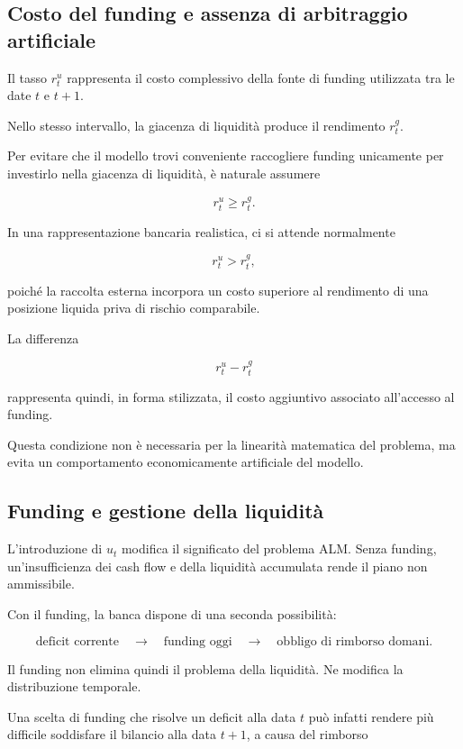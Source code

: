 \subsection{Costo del funding e assenza di arbitraggio artificiale}

Il tasso $r^u_t$ rappresenta il costo complessivo della fonte di funding
utilizzata tra le date $t$ e $t+1$.

Nello stesso intervallo, la giacenza di liquidit\`a produce il rendimento
$r^g_t$.

Per evitare che il modello trovi conveniente raccogliere funding unicamente
per investirlo nella giacenza di liquidit\`a, \`e naturale assumere

\[
r^u_t\geq r^g_t.
\]

In una rappresentazione bancaria realistica, ci si attende normalmente

\[
r^u_t>r^g_t,
\]

\noindent poich\'e la raccolta esterna incorpora un costo superiore al rendimento di una
posizione liquida priva di rischio comparabile.

La differenza

\[
r^u_t-r^g_t
\]

\noindent rappresenta quindi, in forma stilizzata, il costo aggiuntivo associato
all'accesso al funding.

Questa condizione non \`e necessaria per la linearit\`a matematica del
problema, ma evita un comportamento economicamente artificiale del modello.

\subsection{Funding e gestione della liquidit\`a}

L'introduzione di $u_t$ modifica il significato del problema ALM. Senza funding, un'insufficienza dei cash flow e della liquidit\`a accumulata
rende il piano non ammissibile.

Con il funding, la banca dispone di una seconda possibilit\`a:

\[
\text{deficit corrente}
\quad\longrightarrow\quad
\text{funding oggi}
\quad\longrightarrow\quad
\text{obbligo di rimborso domani}.
\]

Il funding non elimina quindi il problema della liquidit\`a. Ne modifica la
distribuzione temporale.

Una scelta di funding che risolve un deficit alla data $t$ pu\`o infatti
rendere pi\`u difficile soddisfare il bilancio alla data $t+1$, a causa del
rimborso

